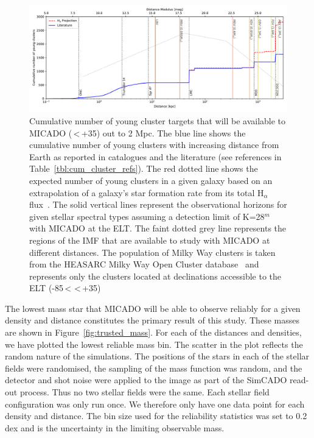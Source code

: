 \documentclass[referee]{aa}
\begin{document}
\begin{figure}

    \centering
    \includegraphics[width=\textwidth]{young_clusters_within_2Mpc_incl_MW.pdf}

    \caption{Cumulative number of young cluster targets that will be available to MICADO (\textdelta\,\textless\,+35\textdegree) out to 2 Mpc.
    The blue line shows the cumulative number of young clusters with increasing distance from Earth as reported in catalogues and the literature (see references in Table~\ref{tbl:cum_cluster_refs}).
    The red dotted line shows the expected number of young clusters in a given galaxy based on an extrapolation of a galaxy's star formation rate from its total H$_\alpha$ flux~\citep{caldwell09}.
    The solid vertical lines represent the observational horizons for given stellar spectral types assuming a detection limit of K=28$^m$ with MICADO at the ELT.
    The faint dotted grey line represents the regions of the IMF that are available to study with MICADO at different distances.
    The population of Milky Way clusters is taken from the HEASARC Milky Way Open Cluster database~\citep{heasarc_mwsc} and represents only the clusters located at declinations accessible to the ELT (-85\textdegree\,\textless\,\textdelta\,\textless\,+35\textdegree)
    }
    \label{fig:local_group_cluster_number}

\end{figure}


The lowest mass star that MICADO will be able to observe reliably for a given density and distance constitutes the primary result of this study.
These masses are shown in Figure~\ref{fig:trusted_mass}.
For each of the distances and densities, we have plotted the lowest reliable mass bin.
The scatter in the plot reflects the random nature of the simulations.
The positions of the stars in each of the stellar fields were randomised, the sampling of the mass function was random, and the detector and shot noise were applied to the image as part of the SimCADO read-out process.
Thus no two stellar fields were the same.
Each stellar field configuration was only run once.
We therefore only have one data point for each density and distance.
The bin size used for the reliability statistics was set to 0.2 dex and is the uncertainty in the limiting observable mass.
\end{document}
